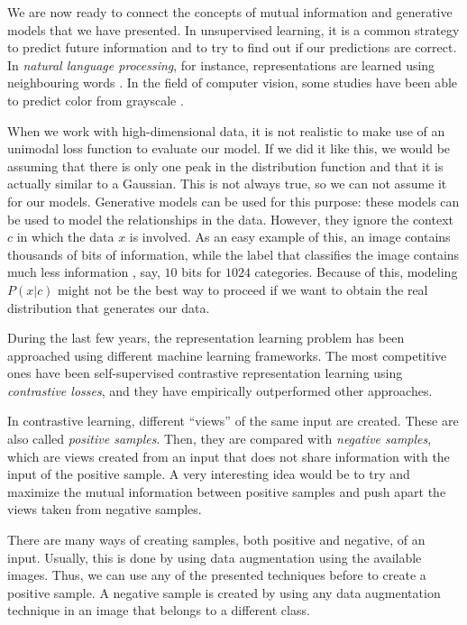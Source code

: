 
\label{Chapter:CPC}
We are now ready to connect the concepts of mutual information and generative models that we have presented. In unsupervised learning,
it is a common strategy to predict future information and to try to find out if our predictions are correct.
In \emph{natural language processing}, for instance, representations are learned 
using neighbouring words \citep{mikolov_efficient_2013}. In the field of computer vision, some studies have been able to predict color from grayscale \citep{doersch_unsupervised_2016}.

When we work with high-dimensional data, it is not realistic to make use of an unimodal loss function to evaluate our model. If we did it like this, we would be assuming that there is only
one peak in the distribution function and that it is actually similar to a Gaussian.  This is not always true, so we can not assume it for our models. Generative models can be used for this purpose:
these models can be used to model the relationships in the data. However, they ignore the context $c$ in which the data $x$ is involved. As an easy example of this, an image contains thousands of bits of information,
while the label that classifies the image contains much less information , say, $10$ bits for $1024$ categories. Because of this, modeling $P(x|c)$ might not be the best way to proceed if we want
to obtain the real distribution that generates our data. 

During the last few years, the representation learning problem has been approached using different machine learning frameworks. The most competitive ones have been self-supervised contrastive representation learning \cite{oord_representation_2019,tian_what_2020,hjelm_learning_2019,gutmann_noise-contrastive_nodate,chen_simple_2020,he_momentum_2020} using \emph{contrastive losses}, and they have empirically outperformed other approaches.     

In contrastive learning, different ``views'' of the same input are created. These are also called \emph{positive samples}. Then, they are compared with \emph{negative samples}, which are views created from an input that does not share information with the input of the positive sample. A very interesting idea would be to try and maximize the mutual information between positive samples and push apart the views taken from negative samples. 

There are many ways of creating samples, both positive and negative, of an input. Usually, this is done by using data augmentation using the available images. Thus, we can use any of the presented techniques before to create a positive sample. A negative sample is created by using any data augmentation technique in an image that belongs to a different class.

